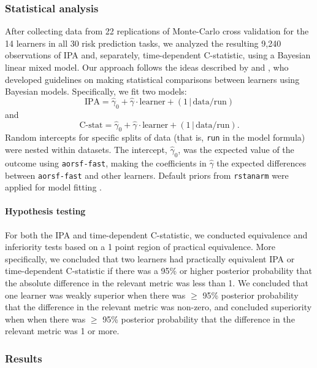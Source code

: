 \documentclass[twoside,11pt]{article}\usepackage[]{graphicx}\usepackage[]{xcolor}
\newcommand{\ie}{that is}
\begin{document}
\subsubsection{Statistical analysis}

After collecting data from 22 replications of Monte-Carlo cross validation for the 14 learners in all 30 risk prediction tasks, we analyzed the resulting 9,240 observations of IPA and, separately, time-dependent C-statistic, using a Bayesian linear mixed model. Our approach follows the ideas described by \citet{benavoli2017time} and \citet{tidymodels}, who developed guidelines on making statistical comparisons between learners using Bayesian models. Specifically, we fit two models: $$\text{IPA} = \widehat{\gamma}_0 + \widehat{\gamma} \cdot \text{learner} + (1\,|\, \text{data/run}) $$ and $$\text{C-stat} = \widehat{\gamma}_0 + \widehat{\gamma} \cdot \text{learner} + (1\,|\, \text{data/run}).$$ Random intercepts for specific splits of data (\ie, \texttt{run} in the model formula) were nested within datasets. The intercept, $\widehat{\gamma}_0$, was the expected value of the outcome using \texttt{aorsf-fast}, making the coefficients in $\widehat{\gamma}$ the expected differences between \texttt{aorsf-fast} and other learners. Default priors from \texttt{rstanarm} were applied for model fitting \citep{rstanarm}.

\paragraph{Hypothesis testing} For both the IPA and time-dependent C-statistic, we conducted equivalence and inferiority tests based on a 1 point region of practical equivalence. More specifically, we concluded that two learners had practically equivalent IPA or time-dependent C-statistic if there was a 95\% or higher posterior probability that the absolute difference in the relevant metric was less than 1. We concluded that one learner was weakly superior when there was $\geq$ 95\% posterior probability that the difference in the relevant metric was non-zero, and concluded superiority when when there was $\geq$ 95\% posterior probability that the difference in the relevant metric was 1 or more.



\subsubsection{Results} \label{sec:results_pred}
\end{document}
